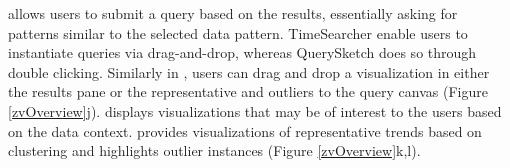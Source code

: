  allows users to submit a query based on the results, essentially asking for patterns similar to the selected data pattern. TimeSearcher enable users to instantiate queries via drag-and-drop, whereas QuerySketch does so through double clicking. Similarly in \zv, users can drag and drop a visualization in either the results pane or the representative and outliers to the query canvas (Figure \ref{zvOverview}j). %
 displays visualizations that may be of interest to the users based on the data context. \zv provides visualizations of representative trends based on clustering and highlights outlier instances (Figure \ref{zvOverview}k,l).%
